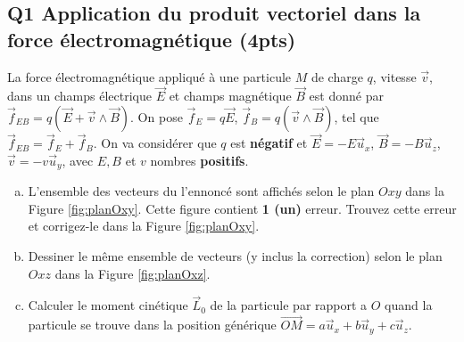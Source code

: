 \documentclass[french,10pt,twocolumn]{article}
\begin{document}
	\FloatBarrier
	
	\subsection*{Q1 Application du produit vectoriel dans la force électromagnétique (4pts)}
	La force électromagnétique appliqué à une particule $M$ de charge $q$, vitesse $\vec{v}$, dans un champs électrique $\vec{E}$ et champs magnétique $\vec{B}$ est donné par $\vec{f}_{EB} = q (\vec{E} + \vec{v} \wedge \vec{B})$. On pose $\vec{f}_E = q \vec{E}$, $\vec{f}_B =   q  (\vec{v} \wedge \vec{B})$, tel que $\vec{f}_{EB} = \vec{f}_E + \vec{f}_B$. On va considérer que $q$ est \textbf{négatif} et $\vec{E} = -E \vec{u}_x$, $\vec{B} = - B \vec{u}_z$, $\vec{v} = -v \vec{u}_y$, avec $E, B$ et $v$ nombres \textbf{positifs}.
	\begin{enumerate}[a)]
		\item L'ensemble des vecteurs du l'ennoncé sont affichés selon le plan $Oxy$ dans la Figure \ref{fig:planOxy}. Cette figure contient {\bf 1 (un)} erreur. Trouvez cette erreur et corrigez-le dans la Figure \ref{fig:planOxy}.  
		\item Dessiner le même ensemble de vecteurs (y inclus la correction) selon le plan $Oxz$ dans la Figure \ref{fig:planOxz}.
		\item Calculer le moment cinétique $\vec{L}_0$ de la particule par rapport a $O$ quand la particule se trouve dans la position générique $\vec{OM} = a\vec{u}_x + b\vec{u}_y + c\vec{u}_z$.
	\end{enumerate}
	
\end{document}
